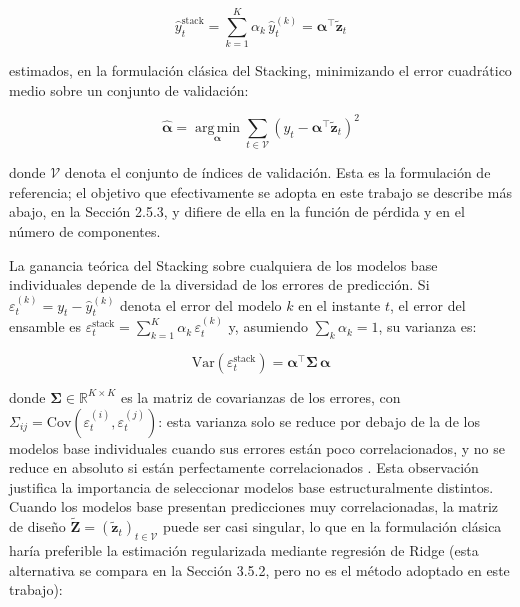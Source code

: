\begin{equation}
    \hat{y}_t^{\text{stack}} = \sum_{k=1}^{K} \alpha_k\, \hat{y}_t^{(k)} = \boldsymbol{\alpha}^\top \tilde{\mathbf{z}}_t
    \label{eq:stacking_lineal}
\end{equation}

estimados, en la formulación clásica del Stacking, minimizando el error cuadrático medio sobre un conjunto de validación:

\begin{equation}
    \hat{\boldsymbol{\alpha}} = \operatorname*{arg\,min}_{\boldsymbol{\alpha}} \sum_{t \in \mathcal{V}} \left(y_t - \boldsymbol{\alpha}^\top \tilde{\mathbf{z}}_t\right)^2
    \label{eq:stacking_opt}
\end{equation}

donde $\mathcal{V}$ denota el conjunto de índices de validación. Esta es la formulación de referencia; el objetivo que efectivamente se adopta en este trabajo se describe más abajo, en la Sección 2.5.3, y difiere de ella en la función de pérdida y en el número de componentes.

La ganancia teórica del Stacking sobre cualquiera de los modelos base individuales depende de la diversidad de los errores de predicción. Si $\varepsilon_t^{(k)} = y_t - \hat{y}_t^{(k)}$ denota el error del modelo $k$ en el instante $t$, el error del ensamble es $\varepsilon_t^{\text{stack}} = \sum_{k=1}^K \alpha_k\, \varepsilon_t^{(k)}$ y, asumiendo $\sum_k \alpha_k = 1$, su varianza es:

\begin{equation}
    \text{Var}\!\left(\varepsilon_t^{\text{stack}}\right) = \boldsymbol{\alpha}^\top \boldsymbol{\Sigma}\, \boldsymbol{\alpha}
\end{equation}

donde $\boldsymbol{\Sigma} \in \mathbb{R}^{K \times K}$ es la matriz de covarianzas de los errores, con $\Sigma_{ij} = \text{Cov}(\varepsilon_t^{(i)}, \varepsilon_t^{(j)})$: esta varianza solo se reduce por debajo de la de los modelos base individuales cuando sus errores están poco correlacionados, y no se reduce en absoluto si están perfectamente correlacionados \cite{Dietterich}. Esta observación justifica la importancia de seleccionar modelos base estructuralmente distintos. Cuando los modelos base presentan predicciones muy correlacionadas, la matriz de diseño $\tilde{\mathbf{Z}} = (\tilde{\mathbf{z}}_t)_{t \in \mathcal{V}}$ puede ser casi singular, lo que en la formulación clásica haría preferible la estimación regularizada mediante regresión de Ridge (esta alternativa se compara en la Sección 3.5.2, pero no es el método adoptado en este trabajo):


